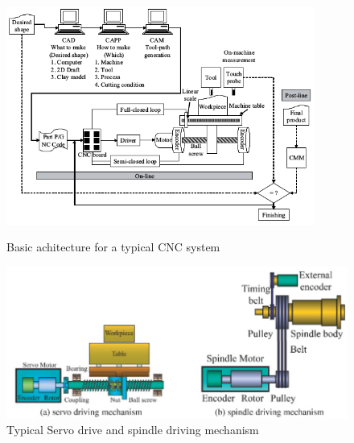 \begin{figure} 
	\caption{Basic achitecture for a typical CNC system}
	\includegraphics[width=0.90\textwidth]{Chap2/Images/CNC-Basic-Architecture.png} 
	\label{CNC-Basic-Architecture.png}
\end{figure}

\clearpage
\pagebreak

\begin{figure}
	\caption{Typical Servo drive and spindle driving mechanism}
	\label{CNC-Servo-and-Spindle-Driving-Mechanism.png}
	\includegraphics[width=1.00\textwidth]{Chap2/Images/CNC-Servo-and-Spindle-Driving-Mechanism.png} 
\end{figure}



